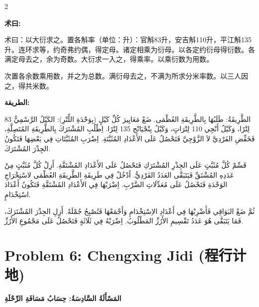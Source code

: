 \documentclass[11pt,a4paper]{article}
\newcommand{\ar}[1]{\arabicfont\beginR #1\endR}
\newcommand{\zhtext}[1]{{\chinese #1}}
\newenvironment{bilingual}{%
  \begin{paracol}{2}
}{%
  \end{paracol}
}
\newcommand{\cnlabel}[1]{\textcolor{algocolor}{\textbf{#1}}}
\newcommand{\arlabel}[1]{\ar{\textcolor{algocolor}{\textbf{#1}}}}
\begin{document}
\begin{bilingual}

\begin{leftcolumn*}
\cnlabel{术曰:}

术曰：以大衍求之。置各斛率（单位：升）：官斛83升，安吉斛110升，平江斛135升。连环求等，约奇弗约偶，得定母。诸定相乘为衍母。以各定约衍母得衍数。各满定母去之，余为奇数。大衍求一入之，得乘率。以乘衍数为用数。

次置各余数乘用数，并之为总数。满衍母去之，不满为所求分米率数。以三人因之，得共米数。
\end{leftcolumn*}

\begin{rightcolumn*}
\arlabel{الطريقة:}

\ar{الطَّرِيقَةُ: طَلَبُهَا بِالطَّرِيقَةِ العُظْمَى. ضَعْ مَعَايِيرَ كُلِّ كَيْلٍ (بِوَحْدَةِ اللِّتْرِ): الكَيْلُ الرَّسْمِيُّ 83 لِتْرًا، وَكَيْلُ أَنْجِي 110 لِتْرَاتٍ، وَكَيْلُ بِنْجْيَانْج 135 لِتْرًا. اِطْلُبِ المُشْتَرَكَ بِالطَّرِيقَةِ المُتَصِلَّةِ، فَخَفِّضِ الفَرْدِيَّ لاَ الزَّوْجِيَّ فَتَحْصُلُ عَلَى الأَعْدَادِ المُثَبَّتَةِ. اِضْرَبِ المُثَبَّتَاتِ فِي بَعْضِهَا فَتَكُونُ الجِذْرَ المُشْتَرَكَ.}

\ar{قَسِّمْ كُلَّ مُثَبَّتٍ عَلَى الجِذْرِ المُشْتَرَكِ فَتَحْصُلُ عَلَى الأَعْدَادِ المُشْتَقَّةِ. أَزِلْ كُلَّ مُثَبَّتٍ مِنْ عَدَدِهِ المُشْتَقِّ فَيَتَبَقَّى العَدَدُ الفَرْدِيُّ. اُدْخُلْ فِي طَرِيقَةِ الطَّرِيقَةِ العُظْمَى لاسْتِخْرَاجِ الوَحْدَةِ فَتَحْصُلُ عَلَى مُعَدِّلَاتِ الضَّرْبِ. اِضْرَبْهَا فِي الأَعْدَادِ المُشْتَقَّةِ فَتَكُونُ أَعْدَادَ اسْتِخْدَامٍ.}

\ar{ثُمَّ ضَعْ البَوَاقِي فَأَضْرِبْهَا فِي أَعْدَادِ الاِسْتِخْدَامِ وَأَجْمَعْهَا فَتُصْبِحُ جُمْلَةً. أَزِلِ الجِذْرَ المُشْتَرَكَ، فَمَا يَتَبَقَّى هُوَ عَدَدُ تَقْسِيمِ الأَرُزِّ المَطْلُوبُ. اِضْرَبْهُ فِي ثَلَاثَةٍ فَتَحْصُلُ عَلَى مَجْمُوعِ الأَرُزِّ.}
\end{rightcolumn*}

\end{bilingual}

\newpage

\section{Problem 6: Chengxing Jidi (\zhtext{程行计地})}
\ar{\textbf{المَسْأَلَةُ السَّادِسَةُ: حِسَابُ مَسَافَةِ الرِّحْلَةِ}}
\end{document}
